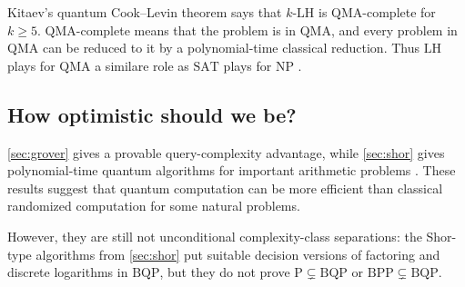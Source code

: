 Kitaev's quantum Cook--Levin theorem says that
\(
k\text{-}\mathrm{LH}
\) is
\(
\mathrm{QMA}
\)-complete for $k \ge 5$.
\(\mathrm{QMA}\)-complete means that the problem is in
\(
\mathrm{QMA}
\),
and every problem in
\(
\mathrm{QMA}
\)
can be reduced to it by a polynomial-time classical reduction.
Thus $\mathrm{LH}$ plays for
\(
\mathrm{QMA}
\)
a similare role as
\(
\mathrm{SAT}
\)
plays for
\(
\mathrm{NP}
\) \cite{gharibianQuantumComplexityTheory}.

\subsection{How optimistic should we be?}

\autoref{sec:grover} gives a provable query-complexity advantage, while \autoref{sec:shor} gives polynomial-time quantum algorithms for important arithmetic problems \cite{nielsenChuangQCQI}.
These results suggest that quantum computation can be more efficient than classical randomized computation for some natural problems.

However, they are still not unconditional complexity-class separations:
the Shor-type algorithms from \autoref{sec:shor} put suitable decision versions of factoring and discrete logarithms in \(\mathrm{BQP}\), but they do not prove
\(
\mathrm{P}\subsetneq\mathrm{BQP}
\)
or
\(
\mathrm{BPP}\subsetneq\mathrm{BQP}
\).

